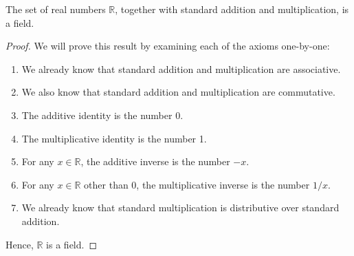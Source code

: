 \begin{prop}
The set of real numbers $ \mathbb{R} $, together with standard addition and multiplication, is a field.
\end{prop}
\begin{proof}
We will prove this result by examining each of the axioms one-by-one:
\begin{enumerate}
    \item We already know that standard addition and multiplication are associative.

    \item We also know that standard addition and multiplication are commutative.

    \item The additive identity is the number 0.
    
    \item The multiplicative identity is the number 1.
    
    \item For any $ x\in\mathbb{R} $, the additive inverse is the number $ -x $.
    
    \item For any $ x\in\mathbb{R} $ other than 0, the multiplicative inverse is the number $ 1/x $.
    
    \item We already know that standard multiplication is distributive over standard addition.
\end{enumerate}
Hence, $ \mathbb{R} $ is a field.
\end{proof}